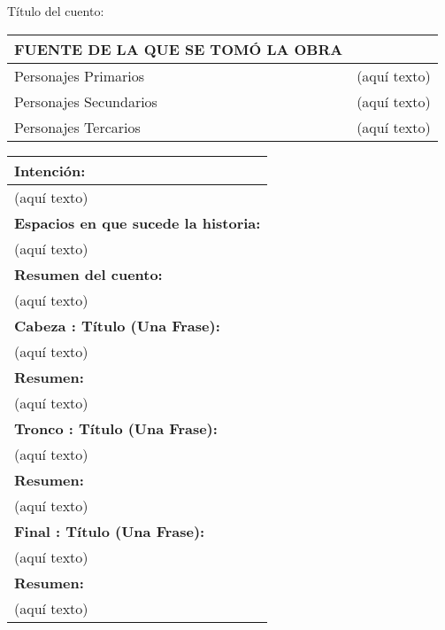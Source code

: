 \documentclass[a4paper]{article}
\begin{document}
Título del cuento:

\begin{tabular}{|l|c|}
  \hline
    \textbf{FUENTE DE LA QUE SE TOMÓ LA OBRA} &  \\ \hline
    Personajes Primarios & (aquí texto)    \\ \hline
    Personajes Secundarios & (aquí texto)  \\ \hline
    Personajes Tercarios & (aquí texto)    \\ \hline
\end{tabular}

\begin{tabular}{|l|}
  \hline
  \textbf{Intención:}                      \\ \hline
  (aquí texto)                             \\ \hline
  \textbf{Espacios en que sucede la historia:} \\ \hline
  (aquí texto)                             \\ \hline
  \textbf{Resumen del cuento:}             \\ \hline
  (aquí texto)                             \\ \hline
  \textbf{Cabeza : Título (Una Frase):}    \\ \hline
  (aquí texto)                             \\ \hline
  \textbf{Resumen:}                        \\ \hline
  (aquí texto)                             \\ \hline
  \textbf{Tronco : Título (Una Frase):}    \\ \hline
  (aquí texto)                             \\ \hline
  \textbf{Resumen:}                        \\ \hline
  (aquí texto)                             \\ \hline
  \textbf{Final : Título (Una Frase):}     \\ \hline
  (aquí texto)                             \\ \hline
  \textbf{Resumen:}                        \\ \hline
  (aquí texto)                             \\ \hline


\end{tabular}
\end{document}
